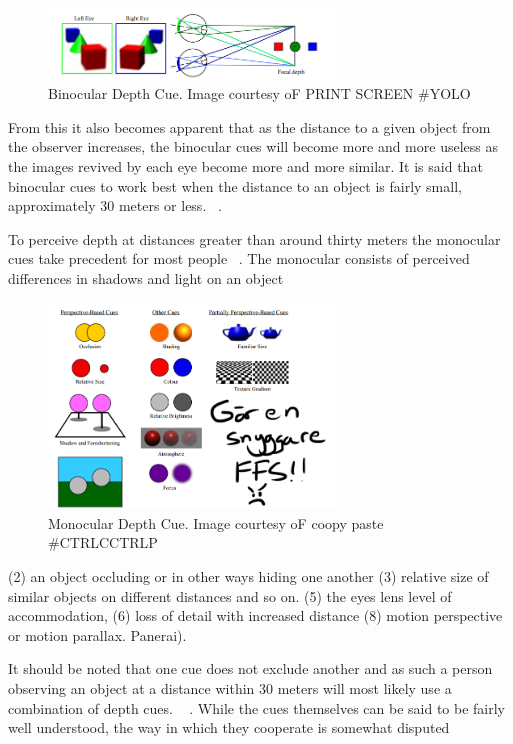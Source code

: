 \documentclass[tog]{acmsiggraph}
\begin{document}
\begin{figure}[ht]
	\centering
	\includegraphics[width=3.0in]{images/depthCuesBinocular}
	\caption{Binocular Depth Cue. Image courtesy oF PRINT SCREEN \#YOLO}
	\label{fig:DepthPerception}
\end{figure}
 
From this it also becomes apparent that as the distance to a given object from the observer increases, the binocular cues will become more and more useless as the images revived by each eye become more and more similar. It is said that binocular cues to work best when the distance to an object is fairly small, approximately 30 meters or less. ~\cite {Palvqvist:2013:DPDS}.

To perceive depth at distances greater than around thirty meters the monocular cues take precedent for most people ~\cite {Palvqvist:2013:DPDS}. The monocular consists of perceived differences in shadows and light on an object 

\begin{figure}[ht]
	\centering
	\includegraphics[width=3.0in]{images/depthCues}
	\caption{Monocular Depth Cue. Image courtesy oF coopy paste \#CTRLCCTRLP}
	\label{fig:DepthPerception}
\end{figure}

(2) an object occluding or in other ways hiding one another (3) relative size of similar objects on different distances and so on. (5) the eyes lens level of accommodation, (6) loss of detail with increased distance (8) motion perspective or motion parallax.
Panerai).

It should be noted that one cue does not exclude another and as such a person observing an object at a distance within 30 meters will most likely use a combination of depth cues. ~\cite {Boyd:2000:DPC} . While the cues themselves can be said to be fairly well understood, the way in which they cooperate is somewhat disputed ~\cite {Boyd:2000:DPC} 
\end{document}
